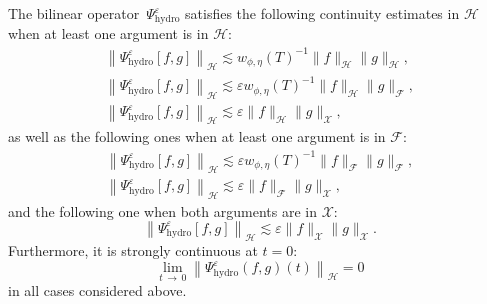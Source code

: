 \documentclass[10pt]{amsart}
\theoremstyle{definition}\newtheorem{defi}[theo]{Definition}\newtheorem{rema}[theo]{Remark}\newtheorem{exam}[theo]{Example}\newtheorem{exem}[theo]{Example}\newtheorem{nota}[theo]{Notation}
\newcommand{\hyd}{\mathrm{hydro}}
\newcommand{\HH}{\mathcal{H}}
\newcommand{\FFF}{\mathscr{F}}
\newcommand{\HHH}{\mathscr{H}}
\newcommand{\GGG}{\mathscr{X}}
\newcommand{\SSs}{\HH}
\newcommand{\SSSs}{\HHH}
\newcommand{\SSSl}{\GGG}
\newcommand{\SSSm}{\FFF}
\newcommand*\eps{{\varepsilon}}
\begin{document}
\begin{prop}\label{prop:bilinear_hydrodynamic}
The bilinear operator~$\Psi^\eps_\hyd$ satisfies the following continuity estimates in $\SSSs$ when at least one argument is in $\SSSs$:
\begin{subequations}\label{eq:bilinear_hyd_hyd}
\begin{gather}
\left\| \Psi^\eps_\hyd [f, g] \right\|_\SSSs \lesssim w_{\phi, \eta}(T)^{-1} \| f \|_\SSSs \| g \|_\SSSs,\label{eq:bilinear_hyd_hyd_hyd}\\
\left\| \Psi^\eps_\hyd [f, g] \right\|_\SSSs \lesssim \eps w_{\phi, \eta}(T)^{-1} \| f \|_\SSSs \| g \|_\SSSm,\label{eq:bilinear_hyd_hyd_mix}\\
\left\| \Psi^\eps_\hyd [f, g] \right\|_\SSSs \lesssim \eps \| f \|_\SSSs \| g \|_\SSSl,\label{eq:bilinear_hyd_hyd_kin}
\end{gather}
\end{subequations}
as well as the following ones when at least one argument is in $\SSSm$:
\begin{subequations}\label{eq:bilinear_hyd_mix}
\begin{gather}
\left\| \Psi^\eps_\hyd [f, g] \right\|_\SSSs \lesssim \eps w_{\phi, \eta}(T)^{-1} \| f \|_\SSSm \| g \|_\SSSm,\label{eq:bilinear_hyd_mix_mix}\\
\left\| \Psi^\eps_\hyd [f, g] \right\|_\SSSs \lesssim \eps \| f \|_\SSSm \| g \|_\SSSl,\label{eq:bilinear_hyd_mix_kin}
\end{gather}
\end{subequations}
and the following one when both arguments are in $\SSSl$:
\begin{equation}\label{eq:bilinear_hyd_kin_kin}
\left\| \Psi^\eps_\hyd [f, g] \right\|_\SSSs \lesssim \eps \| f \|_\SSSl \| g \|_\SSSl.
\end{equation}
Furthermore, it is strongly continuous at $t=0$:
\[
\lim_{t\,\to\,0}\left\| \Psi_\hyd^\eps(f, g)(t) \right\|_{\SSs}=0
\]
in all cases considered above.
\end{prop}
\end{document}
